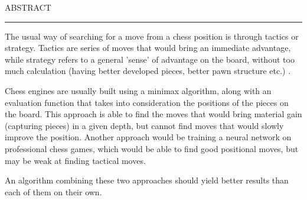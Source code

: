 \documentclass[12pt]{report}
\begin{document}
\newpage
\thispagestyle{empty}
\mbox{}
\newpage
{} 

\cleardoublepage
ABSTRACT
\vspace{0.5cm}	
\hrule
\vspace{0.5cm}	

The usual way of searching for a move from a chess position is through tactics or strategy. Tactics are series of moves that would bring an immediate advantage, while strategy refers to a general 'sense' of advantage on the board, without too much calculation (having better developed pieces, better pawn structure etc.) \cite{klein2022neural}.

Chess engines are usually built using a minimax algorithm, along with an evaluation function that takes into consideration the positions of the pieces on the board. This approach is able to find the moves that would bring material gain (capturing pieces) in a given depth, but cannot find moves that would slowly improve the position. Another approach would be training a neural network on professional chess games, which would be able to find good positional moves, but may be weak at finding tactical moves.

An algorithm combining these two approaches should yield better results than each of them on their own.

\tableofcontents
\newpage
\listoffigures
{}











\end{document}
